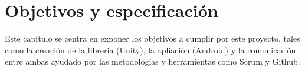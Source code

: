 %
%
%
%
%
%
%
%
%
%

\chapter{Objetivos y especificaci\'on}
\label{cap3}
\label{cap:objetivos}

\begin{FraseCelebre}
\begin{Frase}
\end{Frase}
\begin{Fuente}
\end{Fuente}
\end{FraseCelebre}

\begin{resumen}
  Este cap\'itulo se centra en exponer los objetivos a cumplir por este proyecto, tales como la creaci\'on de la libreria (Unity), la apliaci\'on (Android) y la comunicaci\'on entre ambas ayudado por las metodolog\'ias y herramientas como Scrum y Github.
\end{resumen}

